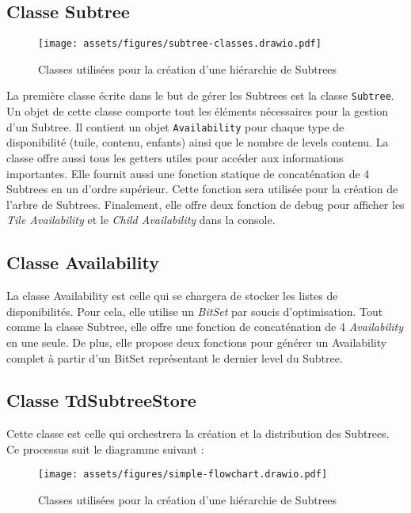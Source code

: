 \subsection*{Classe Subtree}
\label{sec:subtree-class}

\begin{figure}[H]
    \centering
    \texttt{[image: assets/figures/subtree-classes.drawio.pdf]}
    \caption{Classes utilisées pour la création d'une hiérarchie de Subtrees}
    \label{fig:subtree-classes}
\end{figure}

La première classe écrite dans le but de gérer les Subtrees est la classe \texttt{Subtree}. Un objet de cette classe comporte tout les éléments nécessaires pour la gestion d'un Subtree. Il contient un objet \texttt{Availability} pour chaque type de disponibilité (tuile, contenu, enfants) ainsi que le nombre de levels contenu. La classe offre aussi tous les getters utiles pour accéder aux informations importantes. Elle fournit aussi une fonction statique de concaténation de 4 Subtrees en un d'ordre supérieur. Cette fonction sera utilisée pour la création de l'arbre de Subtrees. Finalement, elle offre deux fonction de debug pour afficher les \textit{Tile Availability} et le \textit{Child Availability} dans la console.

\subsection*{Classe Availability}
\label{sec:availability-class}

La classe Availability est celle qui se chargera de stocker les listes de disponibilités. Pour cela, elle utilise un \textit{BitSet} par soucis d'optimisation. Tout comme la classe Subtree, elle offre une fonction de concaténation de 4 \textit{Availability} en une seule. De plus, elle propose deux fonctions pour générer un Availability complet à partir d'un BitSet représentant le dernier level du Subtree.

\subsection*{Classe TdSubtreeStore}
\label{sec:tdsubtreestore-class}

Cette classe est celle qui orchestrera la création et la distribution des Subtrees. Ce processus suit le diagramme suivant :

\begin{figure}[H]
    \centering
    \texttt{[image: assets/figures/simple-flowchart.drawio.pdf]}
    \caption{Classes utilisées pour la création d'une hiérarchie de Subtrees}
    \label{fig:ssimple-flowchart}
\end{figure}

